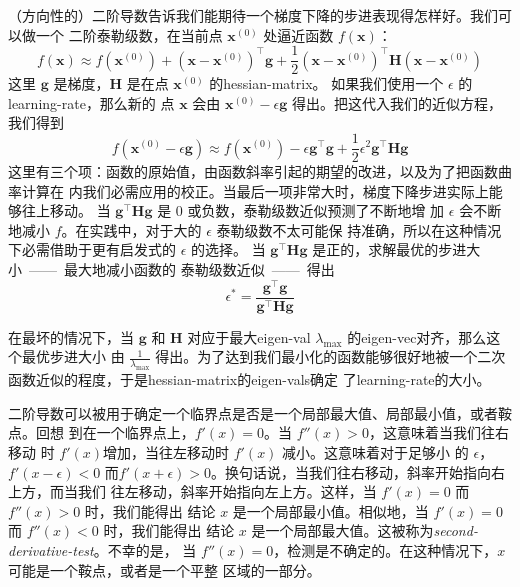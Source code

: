 （方向性的）二阶导数告诉我们能期待一个梯度下降的步进表现得怎样好。我们可以做一个
二阶泰勒级数，在当前点 $\pmb{x}^{(0)}$ 处逼近函数 $f(\pmb{x})$：
\begin{equation}
  f(\pmb{x}) \approx f(\pmb{x}^{(0)}) + (\pmb{x} - \pmb{x}^{(0)})^{\top}\pmb{g} + \frac{1}{2}(\pmb{x} - \pmb{x}^{(0)})^{\top}\pmb{H}(\pmb{x} - \pmb{x}^{(0)})
\end{equation}
这里 $\pmb{g}$ 是梯度，$\pmb{H}$ 是在点 $\pmb{x}^{(0)}$ 的\gls*{hessian-matrix}。
如果我们使用一个 $\epsilon$ 的\gls*{learning-rate}，那么新的
点 $\pmb{x}$ 会由 $\pmb{x}^{(0)} - \epsilon\pmb{g}$ 得出。把这代入我们的近似方程，
我们得到
\begin{equation}
  f(\pmb{x}^{(0)} - \epsilon\pmb{g}) \approx f(\pmb{x}^{(0)}) - \epsilon\pmb{g}^{\top}\pmb{g} + \frac{1}{2}\epsilon^2\pmb{g}^{\top}\pmb{H}\pmb{g}
\end{equation}
这里有三个项：函数的原始值，由函数斜率引起的期望的改进，以及为了把函数曲率计算在
内我们必需应用的校正。当最后一项非常大时，梯度下降步进实际上能够往上移动。
当 $\pmb{g}^{\top}\pmb{H}\pmb{g}$ 是 $0$ 或负数，泰勒级数近似预测了不断地增
加 $\epsilon$ 会不断地减小 $f$。在实践中，对于大的 $\epsilon$ 泰勒级数不太可能保
持准确，所以在这种情况下必需借助于更有启发式的 $\epsilon$ 的选择。
当 $\pmb{g}^{\top}\pmb{H}\pmb{g}$ 是正的，求解最优的步进大小~——~最大地减小函数的
泰勒级数近似~——~得出
\begin{equation}
  \epsilon^* = \frac{\pmb{g}^{\top}\pmb{g}}{\pmb{g}^{\top}\pmb{H}\pmb{g}}
\end{equation}

在最坏的情况下，当 $\pmb{g}$ 和 $\pmb{H}$ 对应于最大\gls*{eigen-val}
$\lambda_{\max}$ 的\gls*{eigen-vec}对齐，那么这个最优步进大小
由 $\frac{1}{\lambda_{\max}}$ 得出。为了达到我们最小化的函数能够很好地被一个二次
函数近似的程度，于是\gls*{hessian-matrix}的\gls*{eigen-vals}确定
了\gls*{learning-rate}的大小。

二阶导数可以被用于确定一个临界点是否是一个局部最大值、局部最小值，或者鞍点。回想
到在一个临界点上，$f'(x) = 0$。当 $f''(x) > 0$，这意味着当我们往右移动
时 $f'(x)$增加，当往左移动时 $f'(x)$ 减小。这意味着对于足够小
的 $\epsilon$，$f'(x - \epsilon) < 0$
而$f'(x + \epsilon) > 0$。换句话说，当我们往右移动，斜率开始指向右上方，而当我们
往左移动，斜率开始指向左上方。这样，当 $f'(x) = 0$ 而 $f''(x) > 0$ 时，我们能得出
结论 $x$ 是一个局部最小值。相似地，当 $f'(x) = 0$ 而 $f''(x) < 0$ 时，我们能得出
结论 $x$ 是一个局部最大值。这被称为\emph{\gls{second-derivative-test}}。不幸的是，
当 $f''(x) = 0$，检测是不确定的。在这种情况下，$x$ 可能是一个鞍点，或者是一个平整
区域的一部分。

